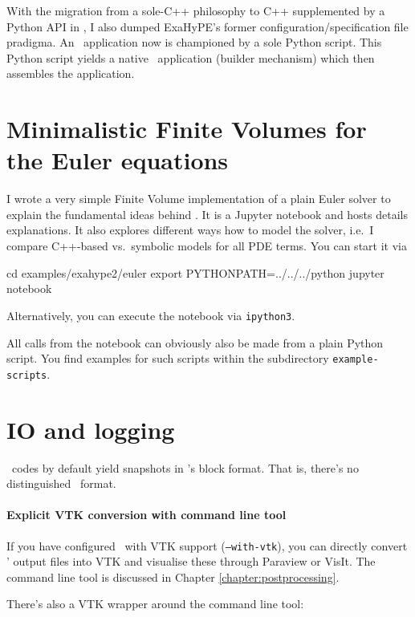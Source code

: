 With the migration from a sole-C++ philosophy to C++ supplemented by a Python
API in \Peano, I also dumped ExaHyPE's former configuration/specification file
pradigma.
An \ExaHyPE\ application now is championed by a sole Python script.
This Python script yields a native \Peano\ application (builder mechanism) which
then assembles the application.



\section{Minimalistic Finite Volumes for the Euler equations}
\label{section:exahype:fv}

I wrote a very simple Finite Volume implementation of a plain Euler solver to
explain the fundamental ideas behind \ExaHyPE.
It is a Jupyter notebook and hosts details explanations.
It also explores different ways how to model the solver, i.e.~I compare
C++-based vs.~symbolic models for all PDE terms.
You can start it via


\begin{code}
cd examples/exahype2/euler
export PYTHONPATH=../../../python
jupyter notebook
\end{code}


\noindent
Alternatively, you can execute the notebook via \texttt{ipython3}.



All calls from the notebook can obviously also be made from a plain Python
script. 
You find examples for such scripts within the subdirectory
\texttt{example-scripts}.


\section{IO and logging}


\ExaHyPE\ codes by default yield snapshots in \Peano's block format. 
That is, there's no distinguished \ExaHyPE\ format.


\paragraph{Explicit VTK conversion with command line tool}
If you have configured \Peano\ with VTK support (\texttt{--with-vtk}), you can
directly convert \ExaHyPE' output files into VTK and visualise these through
Paraview or VisIt.
The command line tool is discussed in Chapter
\ref{chapter:postprocessing}.


There's also a VTK wrapper around the command line tool:

